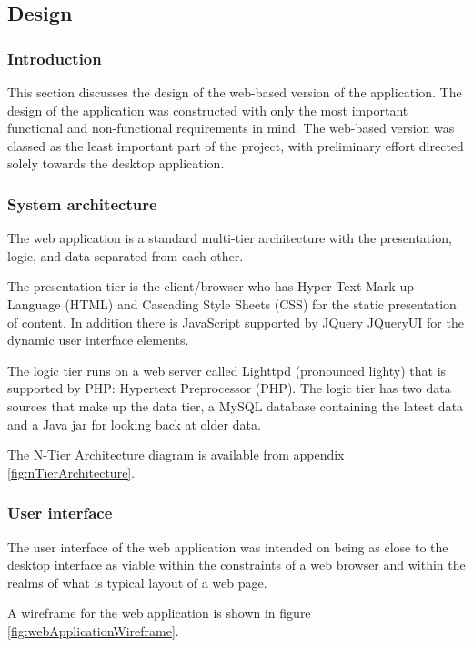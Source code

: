 \subsection{Design}

\subsubsection{Introduction}

This section discusses the design of the web-based version of the application.
The design of the application was constructed with only the most important
functional and non-functional requirements in mind. The web-based version was
classed as the least important part of the project, with preliminary effort
directed solely towards the desktop application.

\subsubsection{System architecture}

The web application is a standard multi-tier architecture with the presentation,
logic, and data separated from each other.

The presentation tier is the client/browser who has Hyper Text Mark-up Language
(HTML) and Cascading Style Sheets (CSS) for the static presentation of content.
In addition there is JavaScript supported by JQuery JQueryUI for the dynamic
user interface elements.

The logic tier runs on a web server called Lighttpd (pronounced lighty) that is
supported by PHP: Hypertext Preprocessor (PHP). The logic tier has two data
sources that make up the data tier, a MySQL database containing the latest data
and a Java jar for looking back at older data.

The N-Tier Architecture diagram is available from appendix
\ref{fig:nTierArchitecture}.

\subsubsection{User interface}

The user interface of the web application was intended on being as close to the
desktop interface as viable within the constraints of a web browser and within
the realms of what is typical layout of a web page.

A wireframe for the web application is shown in figure
\ref{fig:webApplicationWireframe}.

